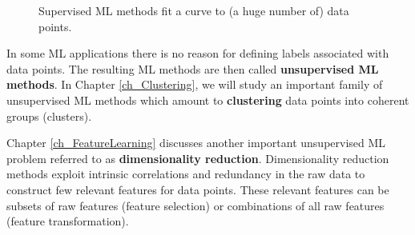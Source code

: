 \documentclass[12pt]{report}
\begin{document}
\begin{figure}[htbp]
\begin{center}
\end{center}
\caption{Supervised ML methods fit a curve to (a huge number of) data points. 
} 
\label{fig_curve_fitting}
\end{figure}

In some ML applications there is no reason for defining labels associated with data points. 
The resulting ML methods are then called {\bf unsupervised ML methods}. In Chapter \ref{ch_Clustering}, 
we will study an important family of unsupervised ML methods which amount to {\bf clustering} data 
points into coherent groups (clusters). 

Chapter \ref{ch_FeatureLearning} discusses another important unsupervised ML problem referred 
to as {\bf dimensionality reduction}. Dimensionality reduction methods exploit intrinsic correlations 
and redundancy in the raw data to construct few relevant features for data points. These relevant 
features can be subsets of raw features (feature selection) or combinations of all raw features (feature transformation). 
\end{document}
